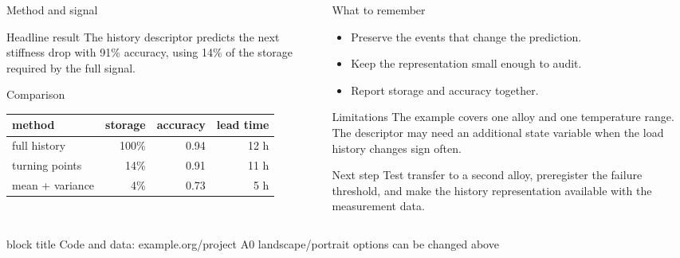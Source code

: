 \documentclass[final]{beamer}
\begin{document}
\begin{frame}[t]
\begin{columns}[t,totalwidth=0.96\paperwidth]
\begin{column}{0.37\paperwidth}
\begin{block}{Method and signal}
\begin{alertblock}{Headline result}
  The history descriptor predicts the next stiffness drop with 91\% accuracy,
  using 14\% of the storage required by the full signal.
\end{alertblock}
\end{block}
\begin{block}{Comparison}
\centering\begin{tabular}{lrrr}\toprule
method & storage & accuracy & lead time\\\midrule
full history & 100\% & 0.94 & 12 h\\
turning points & 14\% & 0.91 & 11 h\\
mean + variance & 4\% & 0.73 & 5 h\\\bottomrule
\end{tabular}
\end{block}
\end{column}
\begin{column}{0.25\paperwidth}
\begin{block}{What to remember}
  \begin{itemize}\itemsep0.55em
    \item Preserve the events that change the prediction.
    \item Keep the representation small enough to audit.
    \item Report storage and accuracy together.
  \end{itemize}
\end{block}
\begin{block}{Limitations}
  The example covers one alloy and one temperature range. The descriptor may
  need an additional state variable when the load history changes sign often.
\end{block}
\begin{block}{Next step}
  Test transfer to a second alloy, preregister the failure threshold, and make
  the history representation available with the measurement data.
\end{block}
\end{column}
\end{columns}
\vfill
\begin{beamercolorbox}[wd=\paperwidth,sep=0.8em,leftskip=2em,rightskip=2em]{block title}
  \small Code and data: example.org/project \hfill A0 landscape/portrait options can be changed above
\end{beamercolorbox}
\end{frame}
\end{document}
